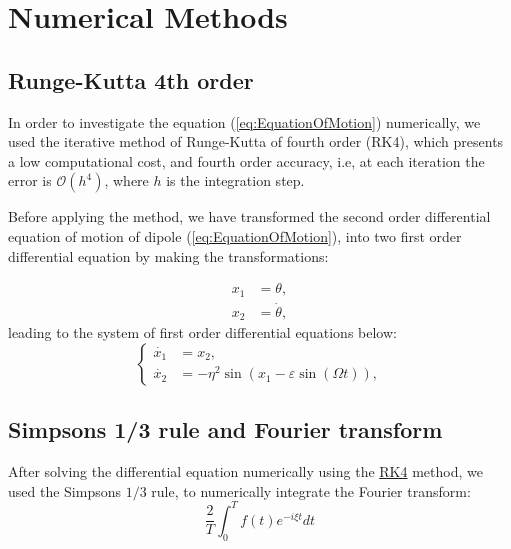 \section{Numerical Methods}

\subsection{Runge-Kutta 4th order}
\label{sec:RK4}
In order to investigate the equation (\ref{eq:EquationOfMotion}) numerically, we used the iterative method of Runge-Kutta of fourth order (RK4), which presents a low computational cost, and fourth order accuracy, i.e, at each iteration the error is $\mathcal{O}(h^4)$, where $h$ is the integration step.

Before applying the method, we have transformed the second order differential equation of motion of dipole (\ref{eq:EquationOfMotion}), into two first order differential equation by making the transformations:

\begin{equation}
    \begin{aligned}
        x_1 &= \theta,\\
        x_2 &= \dot{\theta}, 
    \end{aligned}
\end{equation}
leading to the system of first order differential equations below:
\begin{equation}
    \begin{cases}
        \dot{x_1} &= x_2,\\
        \dot{x_2} &= -\eta^2 \sin(x_1 - \varepsilon \sin(\Omega t)),
    \end{cases}
\end{equation}
\subsection{Simpson\textquotesingle s 1/3 rule and Fourier transform}
After solving the differential equation numerically using the \hyperref[sec:RK4]{RK4} method, we used the Simpson\textquotesingle s $1/3$ rule, to numerically integrate the Fourier transform: 
\begin{equation}
    \dfrac{2}{T}\int_{0}^{T} f(t) e^{- i \xi t}dt
\end{equation}
